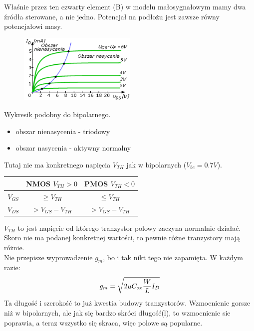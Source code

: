 \documentclass[10pt,a4paper]{article}
\begin{document}
Właśnie przez ten czwarty element (B) w modelu małosygnałowym mamy dwa źródła sterowane, a nie jedno. Potencjał na podłożu jest zawsze równy potencjałowi masy.

\begin{figure}[H]
\centering
\includegraphics[width=0.5\textwidth]{charPol.png}
\end{figure}

Wykresik podobny do bipolarnego.
\begin{itemize}
\item obszar nienasycenia - triodowy
\item obszar nasycenia - aktywny normalny
\end{itemize}

Tutaj nie ma konkretnego napięcia $V_{TH}$ jak w bipolarnych ($V_{be} = 0.7V$). 

\begin{center}
\begin{tabular}{c|c|c}
& NMOS $V_{TH} > 0$ & PMOS $V_{TH} < 0$ \\
\hline
$V_{GS}$ & $\geq V_{TH}$ & $\leq V_{TH}$ \\ 

$V_{DS}$ & $> V_{GS} - V_{TH}$ & $> V_{GS} - V_{TH}$\\ 
\end{tabular}
\end{center}

$V_{TH}$ to jest napięcie od którego tranzystor polowy zaczyna normalnie działać. Skoro nie ma podanej konkretnej wartości, to pewnie różne tranzystory mają różnie.\\
Nie przepisze wyprowadzenie $g_m$, bo i tak nikt tego nie zapamięta. W każdym razie:
\begin{equation}
g_m = \sqrt{2\mu C_{ox}{W \over L}I_D}
\end{equation}
Ta długość i szerokość to już kwestia budowy tranzystorów. Wzmocnienie gorsze niż w bipolarnych, ale jak się bardzo skróci długość(l), to wzmocnienie sie poprawia, a teraz wszystko się skraca, więc polowe są popularne.
\end{document}
